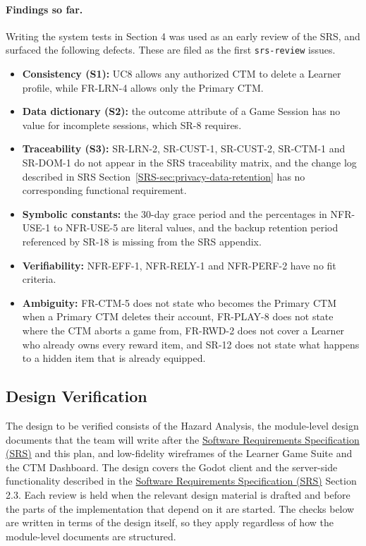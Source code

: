 \documentclass[12pt, titlepage]{article}
\newcommand{\srsref}[1]{#1}
\newcommand{\srssectionref}[1]{SRS Section~\ref*{SRS-#1}}
\begin{document}
\paragraph{Findings so far.} Writing the system tests in Section 4 was used as an early review of the SRS, and surfaced the following defects. These are filed as the first \texttt{srs-review} issues.
\begin{itemize}
  \item \textbf{Consistency (S1):} UC8 allows any authorized CTM to delete a Learner profile, while \srsref{FR-LRN-4} allows only the Primary CTM.
  \item \textbf{Data dictionary (S2):} the outcome attribute of a Game Session has no value for incomplete sessions, which SR-8 requires.
  \item \textbf{Traceability (S3):} SR-LRN-2, SR-CUST-1, SR-CUST-2, SR-CTM-1 and SR-DOM-1 do not appear in the SRS traceability matrix, and the change log described in \srssectionref{sec:privacy-data-retention} has no corresponding functional requirement.
  \item \textbf{Symbolic constants:} the 30-day grace period and the percentages in NFR-USE-1 to NFR-USE-5 are literal values, and the backup retention period referenced by SR-18 is missing from the SRS appendix.
  \item \textbf{Verifiability:} NFR-EFF-1, NFR-RELY-1 and NFR-PERF-2 have no fit criteria.
  \item \textbf{Ambiguity:} FR-CTM-5 does not state who becomes the Primary CTM when a Primary CTM deletes their account, FR-PLAY-8 does not state where the CTM aborts a game from, FR-RWD-2 does not cover a Learner who already owns every reward item, and SR-12 does not state what happens to a hidden item that is already equipped.
\end{itemize}

\subsection{Design Verification}

\label{sec:design-ver}

The design to be verified consists of the Hazard Analysis, the module-level
design documents that the team will write after the
\href{https://github.com/meena-alomran/game-n-grow/blob/main/pdfs/SRS-IEEE/SRS.pdf}{Software Requirements Specification (SRS)} and this plan, and
low-fidelity wireframes of the Learner Game Suite and the CTM Dashboard. The
design covers the Godot client and the server-side functionality described in
the \href{https://github.com/meena-alomran/game-n-grow/blob/main/pdfs/SRS-IEEE/SRS.pdf}{Software Requirements Specification (SRS)} Section 2.3. Each review is held when the
relevant design material is drafted and before the parts of the implementation
that depend on it are started. The checks below are written in terms of the
design itself, so they apply regardless of how the module-level documents are
structured.
\end{document}
